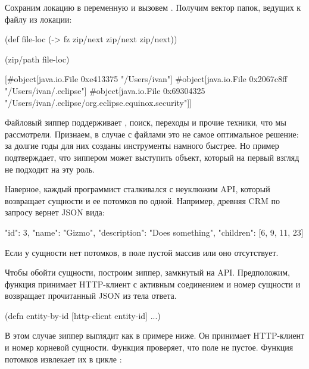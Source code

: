 Сохраним локацию в переменную и вызовем . Получим вектор папок,
ведущих к файлу из локации:

\begin{english}
  \begin{clojure}
(def file-loc
  (-> fz zip/next zip/next zip/next))

(zip/path file-loc)

[#object[java.io.File 0xe413375 "/Users/ivan"]
 #object[java.io.File 0x2067c8ff "/Users/ivan/.eclipse"]
 #object[java.io.File 0x69304325 "/Users/ivan/.eclipse/org.eclipse.equinox.security"]]
  \end{clojure}
\end{english}

Файловый зиппер поддерживает , поиск, переходы и прочие техники, что
мы рассмотрели. Признаем, в случае с файлами это не самое оптимальное решение:
за долгие годы для них созданы инструменты намного быстрее. Но пример
подтверждает, что зиппером может выступить объект, который на первый взгляд не
подходит на эту роль.

Наверное, каждый программист сталкивался с неуклюжим API, который возвращает
сущности и ее потомков по одной. Например, древняя CRM по запросу  вернет JSON вида:

\begin{english}
  \begin{json}
{
  "id": 3,
  "name": "Gizmo",
  "description": "Does something",
  "children": [6, 9, 11, 23]
}
  \end{json}
\end{english}

Если у сущности нет потомков, в поле  пустой массив или оно
отсутствует.

Чтобы обойти сущности, построим зиппер, замкнутый на API. Предположим, функция
 принимает HTTP-клиент с активным соединением и номер сущности и
возвращает прочитанный JSON из тела ответа.

\begin{english}
  \begin{clojure}
(defn entity-by-id [http-client entity-id]
  ...)
  \end{clojure}
\end{english}

В этом случае зиппер выглядит как в примере ниже. Он принимает HTTP-клиент и
номер корневой сущности. Функция  проверяет, что поле  не
пустое. Функция потомков извлекает их в цикле :

